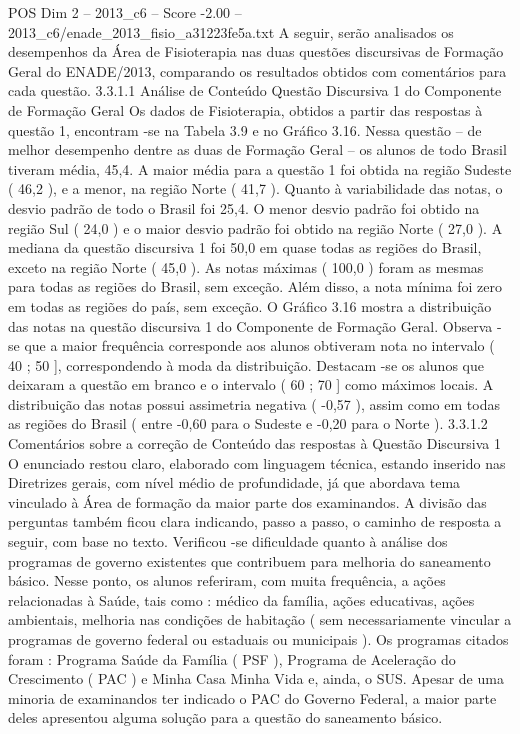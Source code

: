 \begin{textsample}{POS Dim 2 – 2013\_c6 – Score -2.00 – 2013\_c6/enade\_2013\_fisio\_a31223fe5a.txt}
A seguir, serão analisados os desempenhos da Área de Fisioterapia nas duas questões discursivas de Formação Geral do ENADE/2013, comparando os resultados obtidos com comentários para cada questão. 3.3.1.1 Análise de Conteúdo Questão Discursiva 1 do Componente de Formação Geral Os dados de Fisioterapia, obtidos a partir das respostas à questão 1, encontram -se na Tabela 3.9 e no Gráfico 3.16.
Nessa questão – de melhor desempenho dentre as duas de Formação Geral – os alunos de todo Brasil tiveram média, 45,4.
A maior média para a questão 1 foi obtida na região Sudeste ( 46,2 ), e a menor, na região Norte ( 41,7 ).
Quanto à variabilidade das notas, o desvio padrão de todo o Brasil foi 25,4.
O menor desvio padrão foi obtido na região Sul ( 24,0 ) e o maior desvio padrão foi obtido na região Norte ( 27,0 ).
A mediana da questão discursiva 1 foi 50,0 em quase todas as regiões do Brasil, exceto na região Norte ( 45,0 ).
As notas máximas ( 100,0 ) foram as mesmas para todas as regiões do Brasil, sem exceção.
Além disso, a nota mínima foi zero em todas as regiões do país, sem exceção.
O Gráfico 3.16 mostra a distribuição das notas na questão discursiva 1 do Componente de Formação Geral.
Observa -se que a maior frequência corresponde aos alunos obtiveram nota no intervalo ( 40 ; 50 ], correspondendo à moda da distribuição.
Destacam -se os alunos que deixaram a questão em branco e o intervalo ( 60 ; 70 ] como máximos locais.
A distribuição das notas possui assimetria negativa ( -0,57 ), assim como em todas as regiões do Brasil ( entre -0,60 para o Sudeste e -0,20 para o Norte ). 3.3.1.2 Comentários sobre a correção de Conteúdo das respostas à Questão Discursiva 1 O enunciado restou claro, elaborado com linguagem técnica, estando inserido nas Diretrizes gerais, com nível médio de profundidade, já que abordava tema vinculado à Área de formação da maior parte dos examinandos.
A divisão das perguntas também ficou clara indicando, passo a passo, o caminho de resposta a seguir, com base no texto.
Verificou -se dificuldade quanto à análise dos programas de governo existentes que contribuem para melhoria do saneamento básico.
Nesse ponto, os alunos referiram, com muita frequência, a ações relacionadas à Saúde, tais como : médico da família, ações educativas, ações ambientais, melhoria nas condições de habitação ( sem necessariamente vincular a programas de governo federal ou estaduais ou municipais ).
Os programas citados foram : Programa Saúde da Família ( PSF ), Programa de Aceleração do Crescimento ( PAC ) e Minha Casa Minha Vida e, ainda, o SUS.
Apesar de uma minoria de examinandos ter indicado o PAC do Governo Federal, a maior parte deles apresentou alguma solução para a questão do saneamento básico.

\end{textsample}
